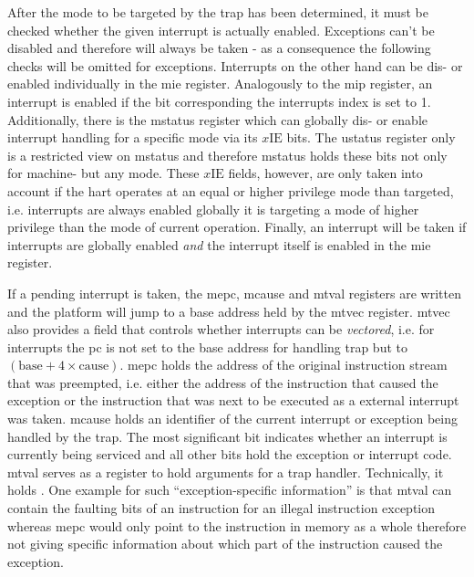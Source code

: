After the mode to be targeted by the trap has been determined, it must be checked whether the given interrupt is actually enabled.
Exceptions can't be disabled and therefore will always be taken - as a consequence the following checks will be omitted for exceptions.
Interrupts on the other hand can be dis- or enabled individually in the \gls{mie} register.
Analogously to the \gls{mip} register, an interrupt is enabled if the bit corresponding the interrupts index is set to 1.
Additionally, there is the \gls{mstatus} register which can globally dis- or enable interrupt handling for a specific mode via its $ x\text{IE} $ bits.
The \gls{ustatus} register only is a restricted view on \gls{mstatus} and therefore \gls{mstatus} holds these bits not only for machine- but any mode.
These $ x\text{IE} $ fields, however, are only taken into account if the \gls{hart} operates at an equal or higher privilege mode than targeted, i.e. interrupts are always enabled globally it is targeting a mode of higher privilege than the mode of current operation.
Finally, an interrupt will be taken if interrupts are globally enabled \textit{and} the interrupt itself is enabled in the \gls{mie} register.

If a pending interrupt is taken, the \gls{mepc}, \gls{mcause} and \gls{mtval} registers are written and the platform will jump to a base address held by the \gls{mtvec} register.
\gls{mtvec} also provides a field that controls whether interrupts can be \textit{vectored}, i.e. for interrupts the \gls{pc} is not set to the base address for handling trap but to $ (\text{base} + 4 \times \text{cause}) $.
\gls{mepc} holds the address of the original instruction stream that was preempted, i.e. either the address of the instruction that caused the exception or the instruction that was next to be executed as a external interrupt was taken.
\gls{mcause} holds an identifier of the current interrupt or exception being handled by the trap.
The most significant bit indicates whether an interrupt is currently being serviced and all other bits hold the exception or interrupt code.
\gls{mtval} serves as a register to hold arguments for a trap handler.
Technically, it holds .
One example for such \enquote{exception-specific information} is that \gls{mtval} can contain the faulting bits of an instruction for an illegal instruction exception whereas \gls{mepc} would only point to the instruction in memory as a whole therefore not giving specific information about which part of the instruction caused the exception.

